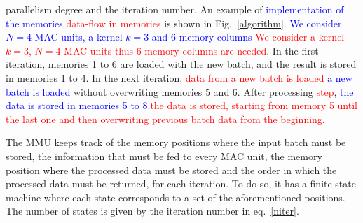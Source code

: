 \documentclass[conference,compsoc]{IEEEtran}
\begin{document}
parallelism degree and the iteration number. An example of \textcolor{blue}{implementation of the
memories} \textcolor{red}{data-flow in memories} is shown in Fig.~\ref{algorithm}. \textcolor{blue}{We consider $N=4$ MAC units, a kernel
$k=3$ and 6 memory columns} \textcolor{red}{We consider a kernel $k=3$, $N=4$ MAC
units thus 6 memory columns are needed}. In the first iteration, memories 1 to 6 
are loaded with the new batch, and the result is stored in memories 1 to 4. In the next
iteration, \textcolor{red}{data from a new batch is loaded }\textcolor{blue}{a new batch is loaded} without overwriting memories 5 and 6. After
processing \textcolor{red}{step}, \textcolor{blue}{the data is stored in memories 5 to
  8.}\textcolor{red}{the data is stored, starting from memory 5 until the last
  one and then overwriting previous batch data from the beginning.}

The MMU keeps track of the memory positions where the input batch must be stored,
the information that must be fed to every MAC unit, the memory position where
the processed data must be stored and the order in which the processed data must
be returned, for each iteration. To do so, it has a finite state machine where
each state corresponds to a set of the aforementioned positions. The number of states
is given by the iteration number in eq.~\eqref{niter}.
\end{document}
